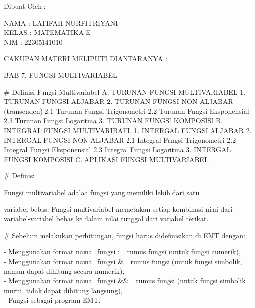 \documentclass[a4paper,10pt]{article}
\begin{document}
\begin{eulernotebook}
\eulersubheading{}
\begin{eulercomment}
Dibuat Oleh :

NAMA  : LATIFAH NURFITRIYANI\\
KELAS : MATEMATIKA E\\
NIM   : 22305141010

\end{eulercomment}
\eulersubheading{}
\begin{eulercomment}
CAKUPAN MATERI MELIPUTI DIANTARANYA :

BAB 7. FUNGSI MULTIVARIABEL\\
\end{eulercomment}
\begin{eulerttcomment}
       # Definisi Fungsi Multivariabel
       A. TURUNAN FUNGSI MULTIVARIABEL
          1. TURUNAN FUNGSI ALJABAR
          2. TURUNAN FUNGSI NON ALJABAR (transenden)
             2.1 Turunan Fungsi Trigonometri
             2.2 Turunan Fungsi Eksponensial
             2.3 Turunan Fungsi Logaritma
          3. TURUNAN FUNGSI KOMPOSISI
       B. INTEGRAL FUNGSI MULTIVARIBAEL
          1. INTERGAL FUNGSI ALJABAR
          2. INTERGAL FUNGSI NON ALJABAR
             2.1 Integral Fungsi Trigonometri
             2.2 Integral Fungsi Eksponensial
             2.3 Integral Fungsi Logaritma
          3. INTERGAL FUNGSI KOMPOSISI
       C. APLIKASI FUNGSI MULTIVARIABEL
\end{eulerttcomment}
\eulersubheading{}
\begin{eulercomment}
# Definisi\\
\end{eulercomment}
\begin{eulerttcomment}
  Fungsi multivariabel adalah fungsi yang memiliki lebih dari satu
\end{eulerttcomment}
\begin{eulercomment}
variabel bebas. Fungsi multivariabel memetakan setiap kombinasi nilai
dari variabel-variabel bebas ke dalam nilai tunggal dari variabel
terikat.

# Sebelum melakukan perhitungan, fungsi harus didefinisikan di EMT
dengan:

- Menggunakan format nama\_fungsi := rumus fungsi (untuk fungsi
numerik),\\
- Menggunakan format nama\_fungsi \&= rumus fungsi (untuk fungsi
simbolik, namun dapat dihitung secara numerik),\\
- Menggunakan format nama\_fungsi \&\&= rumus fungsi (untuk fungsi
simbolik murni, tidak dapat dihitung langsung),\\
- Fungsi sebagai program EMT.


\end{eulercomment}
\end{eulernotebook}
\end{document}
